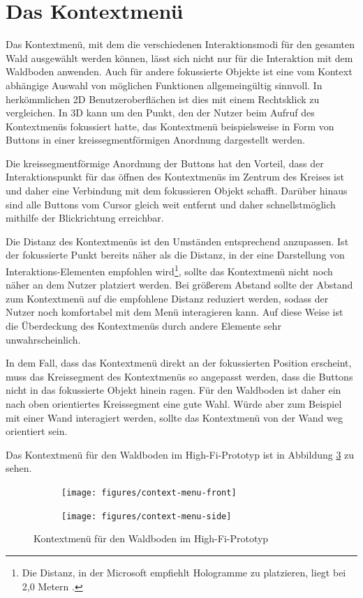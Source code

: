 \section{Das Kontextmenü}
Das Kontextmenü, mit dem die verschiedenen Interaktionsmodi für den gesamten Wald ausgewählt werden können, lässt sich nicht nur für die Interaktion mit dem Waldboden anwenden. Auch für andere fokussierte Objekte ist eine vom Kontext abhängige Auswahl von möglichen Funktionen allgemeingültig sinnvoll. In herkömmlichen 2D Benutzeroberflächen ist dies mit einem Rechtsklick zu vergleichen. In 3D kann um den Punkt, den der Nutzer beim Aufruf des Kontextmenüs fokussiert hatte, das Kontextmenü beispielsweise in Form von Buttons in einer kreissegmentförmigen Anordnung dargestellt werden.

Die kreissegmentförmige Anordnung der Buttons hat den Vorteil, dass der Interaktionspunkt für das öffnen des Kontextmenüs im Zentrum des Kreises ist und daher eine Verbindung mit dem fokussieren Objekt schafft. Darüber hinaus sind alle Buttons vom Cursor gleich weit entfernt und daher schnellstmöglich mithilfe der Blickrichtung erreichbar.

Die Distanz des Kontextmenüs ist den Umständen entsprechend anzupassen. Ist der fokussierte Punkt bereits näher als die Distanz, in der eine Darstellung von Interaktions-Elementen empfohlen wird\footnote{Die Distanz, in der Microsoft empfiehlt Hologramme zu platzieren, liegt bei 2,0 Metern \cite{windows2017interaction}.}, sollte das Kontextmenü nicht noch näher an dem Nutzer platziert werden. Bei größerem Abstand sollte der Abstand zum Kontextmenü auf die empfohlene Distanz reduziert werden, sodass der Nutzer noch komfortabel mit dem Menü interagieren kann. Auf diese Weise ist die Überdeckung des Kontextmenüs durch andere Elemente sehr unwahrscheinlich.

In dem Fall, dass das Kontextmenü direkt an der fokussierten Position erscheint, muss das Kreissegment des Kontextmenüs so angepasst werden, dass die Buttons nicht in das fokussierte Objekt hinein ragen. Für den Waldboden ist daher ein nach oben orientiertes Kreissegment eine gute Wahl. Würde aber zum Beispiel mit einer Wand interagiert werden, sollte das Kontextmenü von der Wand weg orientiert sein.

Das Kontextmenü für den Waldboden im High-Fi-Prototyp ist in Abbildung \ref{fig:context-menu} zu sehen.

\begin{figure}[htb]
  \centering
  \begin{subfigure}[b]{\fwidth}
    \centering
    \texttt{[image: figures/context-menu-front]}
     \label{fig:context-menu-front}
  \end{subfigure}
  \begin{subfigure}[b]{\fwidth}
    \centering
  	\texttt{[image: figures/context-menu-side]}
  	 \label{fig:context-menu-side}
  \end{subfigure}
  \caption{Kontextmenü für den Waldboden im High-Fi-Prototyp} \label{fig:context-menu}
\end{figure}


